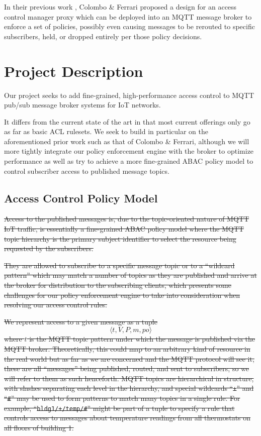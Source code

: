 \documentclass[sigconf, nonacm]{acmart}
\newcommand\tuple[1]{\langle#1\rangle}
\begin{document}
In their previous work \cite{colombo2018access}, Colombo \& Ferrari proposed a design for an access control manager proxy which can be deployed into an MQTT message broker to enforce
a set of policies, possibly even causing messages to be rerouted to specific subscribers, held, or dropped entirely per those policy decisions.


\section{Project Description}
Our project seeks to add fine-grained, high-performance access control to MQTT pub/sub message broker systems for IoT networks.

It differs from the current state of the art in that most current offerings only go as far as basic ACL rulesets.
We seek to build in particular on the aforementioned prior work such as
that of Colombo \& Ferrari, although we will more tightly integrate our
policy enforcement engine with the broker to optimize performance as well as try to achieve a more fine-grained ABAC policy model to
control subscriber access to published message topics.

\subsection{Access Control Policy Model}
\sout{Access to the published messages is, due to the topic-oriented nature of MQTT IoT traffic, is essentially a fine-grained ABAC policy model where the MQTT topic hierarchy is the primary subject identifier to select the resource being requested by the subscribers.}

\sout{They are allowed to subscribe to a specific message topic or to a ``wildcard pattern'' which may match a number of topics as they are published and arrive at the broker for distribution to the subscribing clients, which presents some challenges for our policy enforcement engine to take into consideration when resolving our access control rules.}

\sout{We represent access to a given message as a tuple }
$$\tuple{t,V,P,m,po}$$
\sout{where $t$ is the MQTT topic pattern under which the message is published via the MQTT broker. Theoretically,
this could map to an arbitrary kind of resource in the real world but as far as we are concerned and the
MQTT protocol will see it, these are all ``messages'' being published, routed, and sent to subscribers, so we will
refer to them as such henceforth. MQTT topics are hierarchical in structure, with slashes separating
each level in the hierarchy, and special wildcards ``{\tt +}'' and ``{\tt \#}'' may be used to form patterns to match
many topics in a single rule. For example, ``{\tt bldg1/+/temp/\#}'' might be part of a tuple to specify a rule that controls
access to messages about temperature readings from all thermostats on all floors of building 1.}
\end{document}
